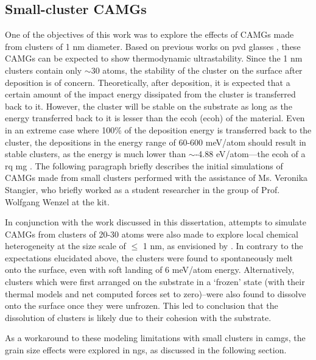 \subsection{Small-cluster CAMGs}
One of the objectives of this work was to explore the effects of CAMGs made from clusters of 1 nm diameter. Based on previous works on \gls{pvd} glasses \cite{Singh2013,Raegen2020}, these CAMGs can be expected to show thermodynamic ultrastability. Since the 1 nm clusters contain only $\sim$30 atoms, the stability of the cluster on the surface after deposition is of concern. Theoretically, after deposition, it is expected that a certain amount of the impact energy dissipated from the cluster is transferred back to it. However, the cluster will be stable on the substrate as long as the energy transferred back to it is lesser than the \glsdesc{ecoh} (\gls{ecoh}) of the material. Even in an extreme case where 100\% of the deposition energy is transferred back to the cluster, the depositions in the energy range of 60-600 meV/atom should result in stable clusters, as the energy is much lower than $\sim$-4.88 eV/atom---the \gls{ecoh} of a \cz \gls{rq} \gls{mg} \cite{Jekal2019}. The following paragraph briefly describes the initial simulations of CAMGs made from small clusters performed with the assistance of Ms. Veronika Stangier, who briefly worked as a student researcher in the group of Prof. Wolfgang Wenzel at the \gls{kit}.  \par

In conjunction with the work discussed in this dissertation, attempts to simulate \cz CAMGs from clusters of 20-30 atoms were also made to explore local chemical heterogeneity at the size scale of $\leq$ 1 nm, as envisioned by \textcite{Kartouzian2014}. In contrary to the expectations elucidated above, the clusters were found to spontaneously melt onto the surface, even with soft landing of 6 meV/atom energy. Alternatively, clusters which were first arranged on the substrate in a `frozen' state (with their thermal models and net computed forces set to zero)--were also found to dissolve onto the surface once they were unfrozen. This led to conclusion that the dissolution of clusters is likely due to their cohesion with the \cz substrate. \par

As a workaround to these modeling limitations with small clusters in \gls{camg}s, the grain size effects were explored in \gls{ng}s, as discussed in the following section.

